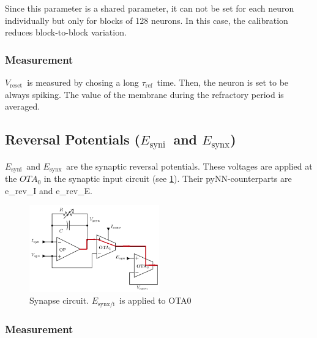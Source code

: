 \documentclass[12pt,a4paper,bibliography=totocnumbered,listof=totocnumbered, DIV12]{scrartcl}
\newcommand{\vreset}{\ensuremath{V_{\text{reset}}}}
\newcommand{\esyn}{\ensuremath{E_{\text{synx/i}}}}
\newcommand{\esynx}{\ensuremath{E_{\text{synx}}}}
\newcommand{\esyni}{\ensuremath{E_{\text{syni}}}}
\newcommand{\tauref}{\ensuremath{\tau_{\text{ref}}}}
\begin{document}
Since this parameter is a shared parameter, it can not be set for each neuron individually but only for blocks of 128 neurons.
In this case, the calibration reduces block-to-block variation.

\subsubsection*{Measurement}
\vreset\ is measured by chosing a long \tauref\ time.
Then, the neuron is set to be always spiking. The value of the
membrane during the refractory period is averaged.

\subsection{Reversal Potentials (\esyni\ and \esynx)}

\esyni\ and \esynx\ are the synaptic reversal potentials. 
These voltages are applied at the $OTA_0$ in the synaptic input circuit (see \cref{figure:synapse}). 
Their pyNN-counterparts are e\_rev\_I and e\_rev\_E.

\begin{figure}
\centering
\includegraphics[width=0.5\textwidth]{figures/synin_dominik}
\caption{Synapse circuit. \esyn\ is applied to OTA0}
\label{figure:synapse}
\end{figure}

\subsubsection*{Measurement}
\end{document}
